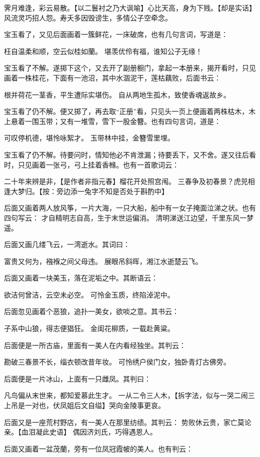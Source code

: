 \documentclass[12pt,oneside]{book}
\begin{document}
霁月难逢，彩云易散。【以二鬟衬之乃大讽喻】心比天高，身为下贱。【却是实话】
风流灵巧招人怨。寿夭多因毁谤生，多情公子空牵念。

宝玉看了，又见后面画着一簇鲜花，一床破席，也有几句言词，写道是：

枉自温柔和顺，空云似桂如蘭。
堪羡优伶有福，谁知公子无缘！

宝玉看了不解。遂掷下这个，又去开了副册橱门，拿起一本册来，揭开看时，只见画着一株桂花，下面有一池沼，其中水涸泥干，莲枯藕败，后面书云：

根并荷花一茎香，平生遭际实堪伤。
自从两地生孤木，致使香魂返故乡。

宝玉看了仍不解。便又掷了，再去取“正册”看，只见头一页上便画着两株枯木，木上悬着一围玉带；又有一堆雪，雪下一股金簪。也有四句言词，道是：

可叹停机德，堪怜咏絮才。
玉带林中挂，金簪雪里埋。

宝玉看了仍不解。待要问时，情知他必不肯泄漏；待要丢下，又不舍。遂又往后看时，只见画着一张弓，弓上挂着香橼。也有一首歌词云：

二十年来辨是非，【是作者非指元春】榴花开处照宫闱。
三春争及初春景？虎兕相逢大梦归。【按：旁边添一兔字不知是否处于斟酌中】

后面又画着两人放风筝，一片大海，一只大船，船中有一女子掩面泣涕之状。也有四句写云：
才自精明志自高，生于末世运偏消。
清明涕送江边望，千里东风一梦遥。

后面又画几缕飞云，一湾逝水。其词曰：

富贵又何为，襁褓之间父母违。
展眼吊斜晖，湘江水逝楚云飞。

后面又画着一块美玉，落在泥垢之中。其断语云：

欲洁何曾洁，云空未必空。
可怜金玉质，终陷淖泥中。

后面忽见画着个恶狼，追扑一美女，欲啖之意。其书云：

子系中山狼，得志便猖狂。
金闺花柳质，一载赴黄粱。

后面便是一所古庙，里面有一美人在内看经独坐。其判云：

勘破三春景不长，缁衣顿改昔年妆。
可怜绣户侯门女，独卧青灯古佛旁。

后面便是一片冰山，上面有一只雌凤。其判曰：

凡鸟偏从末世来，都知爱慕此生才。
一从二令三人木，【拆字法，似与一哭二闹三上吊是一对也，伏凤姐后文自缢】哭向金陵事更哀。

后面又是一座荒村野店，有一美人在那里纺绩。其判云：
势败休云贵，家亡莫论亲。【血泪凝此史语】
偶因济刘氏，巧得遇恩人。

后面又画着一盆茂蘭，旁有一位凤冠霞帔的美人。也有判云：
\end{document}
